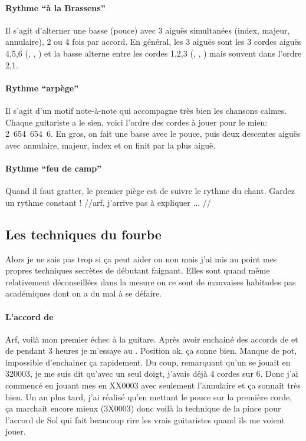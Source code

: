 \documentclass[versionenligne]{framabook}
\begin{document}
\paragraph{Rythme ``à la Brassens''} Il s'agit d'alterner une basse (pouce)
avec 3 aiguës simultanées (index, majeur, annulaire), 2 ou 4 fois par
accord. En général, les 3 aiguës sont les 3 cordes aiguës 4,5,6
(, , ) et la basse alterne entre
les cordes 1,2,3 (, , ) mais
souvent dans l'ordre 2,1.

\paragraph{Rythme ``arpège''} Il s'agit d'un motif note-à-note qui
accompagne très bien les chansons calmes. Chaque guitariste a le
sien, voici l'ordre des cordes à jouer pour le mien: 2~654~654~6. En
gros, on fait une basse avec le pouce, puis deux descentes aiguës avec
annulaire, majeur, index et on finit par la plus aiguë.

\paragraph{Rythme ``feu de camp''} Quand il faut gratter, le premier
piège est de suivre le rythme du chant. Gardez un rythme constant !
//arf, j'arrive pas à expliquer ... //


\subsection{Les techniques du fourbe}

Alors je ne sais pas trop si ça peut aider ou non mais j'ai mis au
point mes propres techniques secrètes de débutant faignant. Elles sont
quand même relativement déconseillées dans la mesure ou ce sont de
mauvaises habitudes pas académiques dont on a du mal à se défaire.

\paragraph{L'accord de }
Arf, voilà mon premier échec à la guitare. Après avoir enchainé des
accords de  et de  pendant 3 heures je
m'essaye au . Position ok, ça sonne bien. Manque de pot,
impossible d'enchainer ça rapidement.  Du coup, remarquant qu'un
 se jouait en 320003, je me suis dit qu'avec un seul
doigt, j'avais déjà 4 cordes sur 6. Donc j'ai commencé en jouant mes
 en XX0003 avec seulement l'annulaire et ça sonnait très
bien. Un an plus tard, j'ai réalisé qu'en mettant le pouce sur la
première corde, ça marchait encore mieux (3X0003) donc voilà la
technique de la pince pour l'accord de Sol qui fait beaucoup rire les
vrais guitaristes quand ils me voient jouer.
\end{document}
